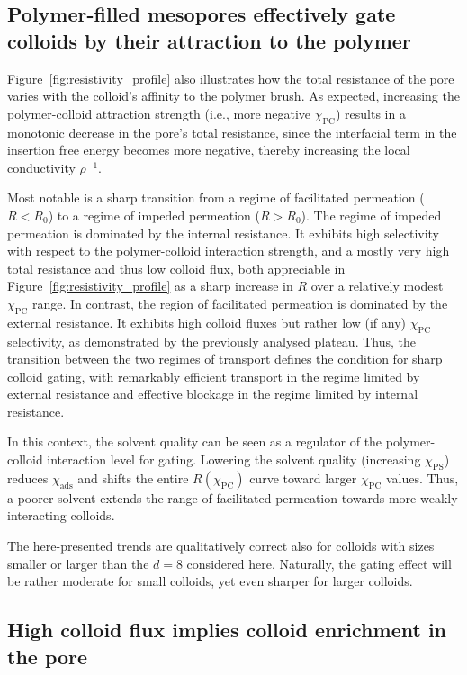 \documentclass[12pt, a4paper]{article}
\begin{document}
\subsection{Polymer-filled mesopores effectively gate colloids by their attraction to the polymer}

Figure~\ref{fig:resistivity_profile} also illustrates how the total resistance of the pore varies with the colloid's affinity to the polymer brush.
As expected, increasing the polymer-colloid attraction strength (i.e., more negative $\chi_{\text{PC}}$) results in a monotonic decrease in the pore's total resistance, since the interfacial term in the insertion free energy becomes more negative, thereby increasing the local conductivity $\rho^{-1}$.

Most notable is a sharp transition from a regime of facilitated permeation ($R < R_0$) to a regime of impeded permeation ($R > R_0$).
The regime of impeded permeation is dominated by the internal resistance.
It exhibits high selectivity with respect to the polymer-colloid interaction strength, and a mostly very high total resistance and thus low colloid flux, both appreciable in Figure~\ref{fig:resistivity_profile} as a sharp increase in $R$ over a relatively modest $\chi_{\text{PC}}$ range.
In contrast, the region of facilitated permeation is dominated by the external resistance. 
It exhibits high colloid fluxes but rather low (if any) $\chi_{\text{PC}}$ selectivity, as demonstrated by the previously analysed plateau.
Thus, the transition between the two regimes of transport defines the condition for sharp colloid gating, with remarkably efficient transport in the regime limited by external resistance and effective blockage in the regime limited by internal resistance.

In this context, the solvent quality can be seen as a regulator of the polymer-colloid interaction level for gating. 
Lowering the solvent quality (increasing $\chi_{\text{PS}}$) reduces $\chi_{\text{ads}}$ and shifts the entire $R(\chi_{\text{PC}})$ curve toward larger $\chi_{\text{PC}}$ values.
Thus, a poorer solvent extends the range of facilitated permeation towards more weakly interacting colloids.

The here-presented trends are qualitatively correct also for colloids with sizes smaller or larger than the $d=8$ considered here.
Naturally, the gating effect will be rather moderate for small colloids, yet even sharper for larger colloids.


\subsection{High colloid flux implies colloid enrichment in the pore}
\end{document}
